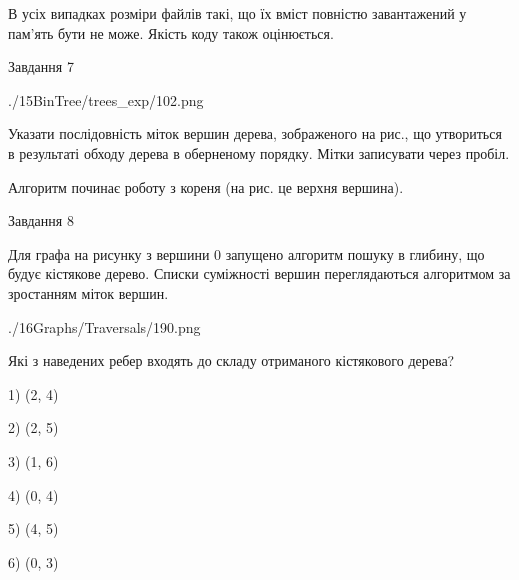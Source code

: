 \documentclass[12pt, ukrainian]{article}
\begin{document}
{В усіх випадках розміри файлів такі, що їх вміст повністю завантажений у пам'ять бути не може. Якість коду також оцінюється.



\vspace{10mm}\par

\newpage
\begin{minipage}[t]{9.7cm}
               
{\begin{center}Завдання {7}\end{center}}
\vspace{-6mm}

\begin{center}
	{./15BinTree/trees_exp/102.png}
\end{center}
Указати послідовність міток вершин дерева, зображеного на рис., що утвориться в результаті обходу дерева в оберненому порядку. Мітки записувати через пробіл.\par Алгоритм починає роботу з кореня (на рис. це верхня вершина).\par

\end{minipage}
\vline \hspace{8mm}
\begin{minipage}[t]{8.0cm}
               
{\begin{center}Завдання {8}\end{center}}
\vspace{-6mm}
Для графа на рисунку з вершини 0 запущено алгоритм пошуку в глибину, що будує кістякове дерево. Списки суміжності вершин переглядаються алгоритмом за зростанням міток вершин.\par
\begin{center}
	{./16Graphs/Traversals/190.png}
\end{center}
\par Які з наведених ребер входять до складу отриманого кістякового дерева?\par
1) (2, 4)\par
2) (2, 5)\par
3) (1, 6)\par
4) (0, 4)\par
5) (4, 5)\par
6) (0, 3)\par
{\vskip 15pt} \par


\end{minipage}}
\end{document}
